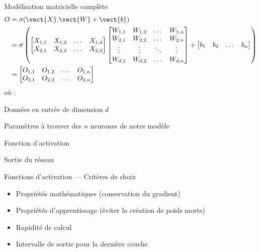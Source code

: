 \begin{frame}{Modélisation matricielle complète}
  \footnotesize
  \begin{align*}
    O & = \sigma (\vect{X}.\vect{W} + \vect{b}) \\
    & = \sigma \left(
    \begin{bmatrix}
      X_{1,1} & X_{1,2} & \dots & X_{1,d} \\
      X_{2,1} & X_{2,2} & \dots & X_{2,d}
    \end{bmatrix}
    \begin{bmatrix}
      W_{1,1} & W_{1,2} & \dots  & W_{1,n} \\
      W_{2,1} & W_{2,2} & \dots  & W_{2,n} \\
      \vdots & \vdots & \ddots & \vdots \\
      W_{d,1} & W_{d,2} & \dots  & W_{d,n}
    \end{bmatrix}
    +
    \begin{bmatrix}
      b_1 & b_2 & \dots & b_n
    \end{bmatrix}
    \right) \\
    & = \begin{bmatrix}
      O_{1,1} & O_{1,2} & \dots & O_{1,n} \\
      O_{2,1} & O_{2,2} & \dots & O_{2,n}
    \end{bmatrix}
  \end{align*}
  où :
  \begin{description}[<+->]
    \item[X] Données en entrée de dimension $d$
    \item[W \& b] Paramètres à trouver des $n$ neurones de notre modèle
    \item[$\bm{\sigma}$] Fonction d'activation
    \item[O] Sortie du réseau
  \end{description}
\end{frame}

\begin{frame}{Fonctions d'activation --- Critères de choix}
  \begin{itemize}[<+->]
    \item Propriétés mathématiques (conservation du gradient)
    \item Propriétés d'apprentissage (éviter la création de poids morts)
    \item Rapidité de calcul
    \item Intervalle de sortie pour la dernière couche
  \end{itemize}
\end{frame}

